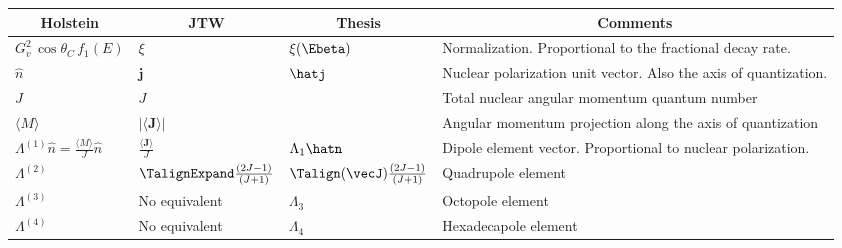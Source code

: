%
%
%
\renewcommand{\arraystretch}{1.6}
\begin{table}[h!!!!t]
	\begin{center}
	\begin{tabular}{ | l | l | l | p{2.35in} | }
		\multicolumn{1}{c}{Holstein} 				& \multicolumn{1}{c}{JTW} 					& \multicolumn{1}{c}{Thesis} 				& \multicolumn{1}{c}{Comments}
		\\  \hline
		$G_v^2 \, \cos\theta_C \, f_1(E)$  			& $\xi$    									& $\xi(\Ebeta)$  							& Normalization.  Proportional to the fractional decay rate.
		\\  \hline
		$\hat{n}$ 									& $\mathbf{j}$								& $\hatj$									& Nuclear polarization unit vector.  Also the axis of quantization.  %
		\\  \hline
		$J$											& $J$ 										& 											& Total nuclear angular momentum quantum number
		\\  \hline
		$\langle M \rangle$							& $ \left| \langle \mathbf{J} \rangle \right| $ 			& 											& Angular momentum projection along the axis of quantization
		\\  \hline
		$\Lambda^{(1)}\hat{n} = \frac{\langle M \rangle}{J} \hat{n} $		& $\frac{\langle \mathbf{J} \rangle}{J}$ 	& $\Lambda_{1}\hatn $ 						& Dipole element vector.  Proportional to nuclear polarization. 
		\\  \hline
		$\Lambda^{(2)}$ 							& $\TalignExpand \frac{(2J-1)}{(J+1)}$ 		& $\Talign(\vecJ) \frac{(2J-1)}{(J+1)}$ 	& Quadrupole element
		\\  \hline 
		$\Lambda^{(3)}$								& No equivalent								& $\Lambda_{3} $							& Octopole element
		\\  \hline
		$\Lambda^{(4)}$								& No equivalent								& $\Lambda_{4} $							& Hexadecapole element

\end{tabular}
\end{center}
\end{table}
